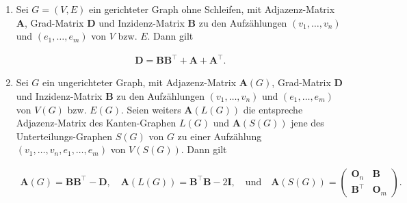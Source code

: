         \begin{proposition} \label{prop:incidence_matrix}

            \begin{enumerate}[
                label = \arabic*.,
                wide,
                labelindent = 0pt
            ]

                \item Sei $G = (V, E)$ ein gerichteter Graph ohne Schleifen, mit Adjazenz-Matrix $\mathbf A$, Grad-Matrix $\mathbf D$ und Inzidenz-Matrix $\mathbf B$ zu den Aufzählungen $(v_1, \dots, v_n)$ und $(e_1, \dots, e_m)$ von $V$ bzw. $E$.
                Dann gilt
    
                \begin{align*}
                    \mathbf D
                    =
                    \mathbf B \mathbf B^\top + \mathbf A + \mathbf A^\top.
                \end{align*}

                \item Sei $G$ ein ungerichteter Graph, mit Adjazenz-Matrix $\mathbf A(G)$, Grad-Matrix $\mathbf D$ und Inzidenz-Matrix $\mathbf B$ zu den Aufzählungen $(v_1, \dots, v_n)$ und $(e_1, \dots, e_m)$ von $V(G)$ bzw. $E(G)$.
                Seien weiters $\mathbf A(L(G))$ die entspreche Adjazenz-Matrix des Kanten-Graphen $L(G)$ und $\mathbf A(S(G))$ jene des Unterteilungs-Graphen $S(G)$ von $G$ zu einer Aufzählung $(v_1, \dots, v_n, e_1, \dots, e_m)$ von $V(S(G))$.
                Dann gilt

                \begin{align*}
                    \mathbf A(G)
                    =
                    \mathbf B \mathbf B^\top - \mathbf D,
                    \quad
                    \mathbf A(L(G))
                    =
                    \mathbf B^\top \mathbf B - 2 \mathbf I,
                    \quad
                    \text{und}
                    \quad
                    \mathbf A(S(G))
                    =
                    \begin{pmatrix}
                        \mathbf O_n    & \mathbf B \\
                        \mathbf B^\top & \mathbf O_m
                    \end{pmatrix}.
                \end{align*}

            \end{enumerate}

        \end{proposition}

